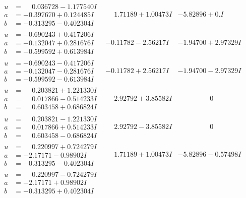 \documentclass[1p]{elsarticle_modified}
\theoremstyle{definition}
\begin{document}
$$\begin{array}{c|c|c}
\begin{aligned}
u &= \phantom{-}0.036728 - 1.177540 I \\
a &= -0.397670 + 0.124485 I \\
b &= -0.313295 - 0.402304 I\end{aligned}
 & \phantom{-}1.71189 + 1.00473 I & -5.82896 + 0. I\phantom{ +0.000000I} \\ \hline\begin{aligned}
u &= -0.690243 + 0.417206 I \\
a &= -0.132047 + 0.281676 I \\
b &= -0.599592 + 0.613984 I\end{aligned}
 & -0.11782 - 2.56217 I & -1.94700 + 2.97329 I \\ \hline\begin{aligned}
u &= -0.690243 - 0.417206 I \\
a &= -0.132047 - 0.281676 I \\
b &= -0.599592 - 0.613984 I\end{aligned}
 & -0.11782 + 2.56217 I & -1.94700 - 2.97329 I \\ \hline\begin{aligned}
u &= \phantom{-}0.203821 + 1.221330 I \\
a &= \phantom{-}0.017866 - 0.514233 I \\
b &= \phantom{-}0.603458 + 0.686824 I\end{aligned}
 & \phantom{-}2.92792 + 3.85582 I & \phantom{-0.000000 } 0 \\ \hline\begin{aligned}
u &= \phantom{-}0.203821 - 1.221330 I \\
a &= \phantom{-}0.017866 + 0.514233 I \\
b &= \phantom{-}0.603458 - 0.686824 I\end{aligned}
 & \phantom{-}2.92792 - 3.85582 I & \phantom{-0.000000 } 0 \\ \hline\begin{aligned}
u &= \phantom{-}0.220997 + 0.724279 I \\
a &= -2.17171 - 0.98902 I \\
b &= -0.313295 - 0.402304 I\end{aligned}
 & \phantom{-}1.71189 + 1.00473 I & -5.82896 - 0.57498 I \\ \hline\begin{aligned}
u &= \phantom{-}0.220997 - 0.724279 I \\
a &= -2.17171 + 0.98902 I \\
b &= -0.313295 + 0.402304 I\end{aligned}

\end{array}$$
\end{document}

